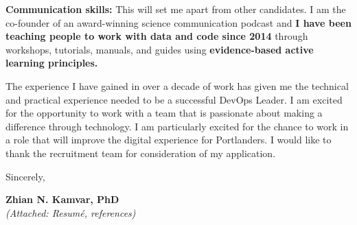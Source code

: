 
\vspace{2ex}

\textbf{Communication skills: }
This will set me apart from other candidates. 
I am the co-founder of an award-winning science communication podcast and
\textbf{I have been teaching people to work with data and code since 2014} through workshops, tutorials, manuals, and guides using \textbf{evidence-based active learning principles.} 


\vspace{2ex}
The experience I have gained in over a decade of work has given me the technical and practical experience needed to be a successful DevOps Leader. 
I am excited for the opportunity to work with a team that is passionate about making a difference through technology.
I am particularly excited for the chance to work in a role that will improve the digital experience for Portlanders.
I would like to thank the recruitment team for consideration of my application.

\vspace{3ex}

Sincerely,

\vspace{4ex}

\textbf{Zhian N. Kamvar, PhD}\\
{\footnotesize \textit{(Attached: Resum\'{e}, references)}}

\clearpage



